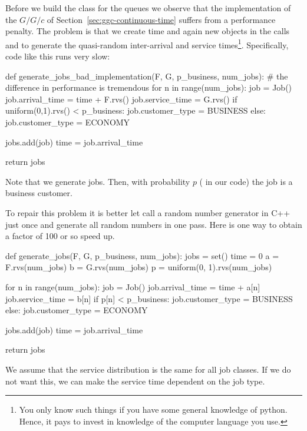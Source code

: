 Before we build the class for the queues we observe that the implementation of the $G/G/c$ of Section~\ref{sec:ggc-continuous-time} suffers from a performance penalty. The problem is that  we create  time and again  new objects in the calls  and   to generate the quasi-random inter-arrival and service times\footnote{You only know such things if you have some general knowledge of python. Hence, it pays to invest in knowledge of the computer language you use.}. Specifically,  code like this runs very slow:
\begin{pyverbatim}
def generate_jobs_bad_implementation(F, G, p_business, num_jobs):
    # the difference in performance is tremendous
    for n in range(num_jobs):
        job = Job()
        job.arrival_time = time + F.rvs()  
        job.service_time = G.rvs()  
        if uniform(0,1).rvs() < p_business:
            job.customer_type = BUSINESS
        else:
            job.customer_type = ECONOMY

        jobs.add(job)
        time = job.arrival_time

    return jobs
\end{pyverbatim}
Note that we generate  jobs. Then, with probability $p$ ( in our code) the job is a business customer. 

To repair this problem it is better let  call a random number generator in C++ just once and generate all random numbers in one pass.
Here is one way to obtain a factor of 100 or so speed up.
\begin{pyverbatim}
def generate_jobs(F, G, p_business, num_jobs):
    jobs = set()
    time = 0
    a = F.rvs(num_jobs)
    b = G.rvs(num_jobs)
    p = uniform(0, 1).rvs(num_jobs)

    for n in range(num_jobs):
        job = Job()
        job.arrival_time = time + a[n]
        job.service_time = b[n]
        if p[n] <  p_business:
            job.customer_type = BUSINESS
        else:
            job.customer_type = ECONOMY

        jobs.add(job)
        time = job.arrival_time

    return jobs
\end{pyverbatim}

We assume that the service distribution is the same for all job classes. If we do not want this, we can make the service time dependent on the job type. 

